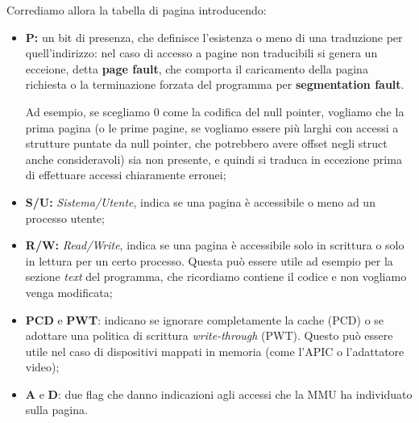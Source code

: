 \documentclass[a4paper,11pt]{article}
\begin{document}
Corrediamo allora la tabella di pagina introducendo:
\begin{itemize}
	\item \textbf{P:} un bit di presenza, che definisce l'esistenza o meno di una traduzione per quell'indirizzo: nel caso di accesso a pagine non traducibili si genera un ecceione, detta \textbf{page fault}, che comporta il caricamento della pagina richiesta o la terminazione forzata del programma per \textbf{segmentation fault}.

		Ad esempio, se scegliamo 0 come la codifica del null pointer, vogliamo che la prima pagina (o le prime pagine, se vogliamo essere più larghi con accessi a strutture puntate da null pointer, che potrebbero avere offset negli struct anche consideravoli) sia non presente, e quindi si traduca in eccezione prima di effettuare accessi chiaramente erronei;
	\item \textbf{S/U:} \textit{Sistema/Utente}, indica se una pagina è accessibile o meno ad un processo utente;  
	\item \textbf{R/W:} \textit{Read/Write}, indica se una pagina è accessibile solo in scrittura o solo in lettura per un certo processo. 
		Questa può essere utile ad esempio per la sezione \textit{text} del programma, che ricordiamo contiene il codice e non vogliamo venga modificata;
	\item \textbf{PCD} e \textbf{PWT}: indicano se ignorare completamente la cache (PCD) o se adottare una politica di scrittura \textit{write-through} (PWT).
		Questo può essere utile nel caso di dispositivi mappati in memoria (come l'APIC o l'adattatore video);
	\item \textbf{A} e \textbf{D}: due flag che danno indicazioni agli accessi che la MMU ha individuato sulla pagina.
\end{itemize}
\end{document}
